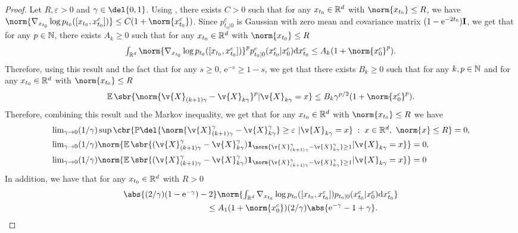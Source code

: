\begin{proof}
	Let $R,\varepsilon > 0$ and $\gamma \in \del{0,1}$.
	Using , there exists $C > 0$ such that for any $x_{t_0} \in \mathbb{R}^d$ with $\norm{x_{t_0}} \leq R$, we have $\norm{\nabla_{x_{t_0}} \log p_{t_0}([x_{t_0}, x_{t_0}^c])} \leq C (1 + \norm{x_{t_0}^c})$.
	Since $p_{t_0|0}^c$ is Gaussian with zero mean and covariance matrix $(1- \mathrm{e}^{-2t_0}) \m{I}$, we get that for any $p \in \mathbb{N}$, there exists $A_k \geq 0$ such that for any $x_{t_0} \in \mathbb{R}^d$ with $\norm{x_{t_0}} \leq R$ \begin{equation} \textstyle \int_{\R^d} \norm{\nabla_{x_{t_0}} \log p_{t_0}([x_{t_0}, x_{t_0}^c])}^p p_{t_0|0}^c(x_{t_0}^c | x_0^c) \mathrm{d} x_{t_0}^c \leq A_k(1 + \norm{x_{0}^c}^p) .
	\end{equation}
	Therefore, using this result and the fact that for any $s \geq 0$, $\mathrm{e}^{-s} \geq 1 -s$, we get that there exists $B_k \geq 0$ such that for any $k, p \in \mathbb{N}$ and for any $x_{t_0} \in \mathbb{R}^d$ with $\norm{x_{t_0}} \leq R$ \begin{equation} \E\sbr{\norm{\v{X}_{(k+1)\gamma} - \v{X}_{k \gamma}}^p \vert \v{X}_{k \gamma}=x} \leq B_k \gamma^{p/2} (1 + \norm{x_{0}^c}^p).
	\end{equation}
	Therefore, combining this result and the Markov inequality, we get that for any $x_{t_0} \in \mathbb{R}^d$ with $\norm{x_{t_0}} \leq R$ we have \begin{align} \label{eq:zero_limit_tot} &\textstyle \lim_{\gamma \to 0} (1/\gamma) \sup \cbr{\mathbb{P} \del{\norm{\v{X}_{(k+1)\gamma}^\gamma - \v{X}_{k \gamma}^\gamma}\geq \varepsilon \ | \v{X}_{k \gamma} = x} \; : \; x \in \R^d, \ \norm{x} \leq R} = 0 , \\ &\textstyle \lim_{\gamma \to 0} (1/\gamma) \norm{\E\sbr{(\v{X}_{(k+1)\gamma}^\gamma - \v{X}_{k \gamma}^\gamma)\mathbf{1}_{\norm{\v{X}_{(k+1)\gamma}^\gamma - \v{X}_{k \gamma}^\gamma} \geq 1} \vert \v{X}_{k \gamma} = x}} = 0 , \\ &\textstyle \lim_{\gamma \to 0} (1/\gamma) \norm{\E\sbr{(\v{X}_{(k+1)\gamma}^\gamma - \v{X}_{k \gamma}^\gamma)\mathbf{1}_{\norm{\v{X}_{(k+1)\gamma}^\gamma - \v{X}_{k \gamma}^\gamma} \geq 1}\vert \v{X}_{k \gamma} = x}} = 0 \end{align} In addition, we have that for any $x_{t_0} \in \mathbb{R}^d$ with $R > 0$ \begin{align} \label{eq:inter_b} & \textstyle \abs{(2/\gamma)(1- \mathrm{e}^{-\gamma}) - 2} \norm{ \int_{\R^d} \nabla_{x_{t_0}} \log p_{t_0}([x_{t_0}, x_{t_0}^c]) p_{t_0|0}(x_{t_0}^c|x_0^c) \mathrm{d} x_{t_0}^c} \\ &\qquad \qquad \qquad \qquad \qquad \leq A_1(1+\norm{x_0^c}) (2/\gamma)\abs{\mathrm{e}^{-\gamma}-1+\gamma} .

\end{align}
\end{proof}
